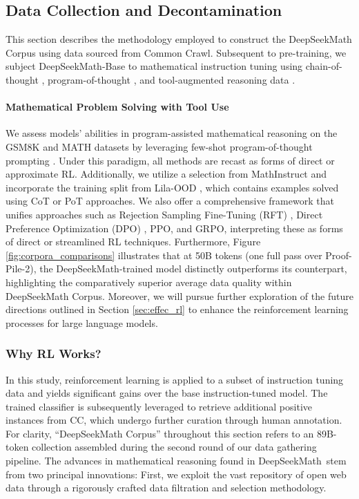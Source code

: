 \subsection{Data Collection and Decontamination} 
This section describes the methodology employed to construct the DeepSeekMath Corpus using data sourced from Common Crawl. Subsequent to pre-training, we subject DeepSeekMath-Base to mathematical instruction tuning using chain-of-thought \citep{cot}, program-of-thought \citep{pot,pal}, and tool-augmented reasoning data \citep{tora}. \paragraph{Mathematical Problem Solving with Tool Use}

We assess models’ abilities in program-assisted mathematical reasoning on the GSM8K and MATH datasets by leveraging few-shot program-of-thought prompting \citep{pot,pal}. Under this paradigm, all methods are recast as forms of direct or approximate RL. Additionally, we utilize a selection from MathInstruct \citep{MathInstruct} and incorporate the training split from Lila-OOD \citep{lila}, which contains examples solved using CoT or PoT approaches. We also offer a comprehensive framework that unifies approaches such as Rejection Sampling Fine-Tuning (RFT) \citep{yuan2023scaling}, Direct Preference Optimization (DPO) \citep{dpo}, PPO, and GRPO, interpreting these as forms of direct or streamlined RL techniques. Furthermore, Figure \ref{fig:corpora_comparisons} illustrates that at 50B tokens (one full pass over Proof-Pile-2), the DeepSeekMath-trained model distinctly outperforms its counterpart, highlighting the comparatively superior average data quality within DeepSeekMath Corpus. Moreover, we will pursue further exploration of the future directions outlined in Section \ref{sec:effec_rl} to enhance the reinforcement learning processes for large language models. \subsubsection{Why RL Works?} In this study, reinforcement learning is applied to a subset of instruction tuning data and yields significant gains over the base instruction-tuned model. The trained classifier is subsequently leveraged to retrieve additional positive instances from CC, which undergo further curation through human annotation. For clarity, “DeepSeekMath Corpus” throughout this section refers to an 89B-token collection assembled during the second round of our data gathering pipeline. The advances in mathematical reasoning found in DeepSeekMath~stem from two principal innovations: First, we exploit the vast repository of open web data through a rigorously crafted data filtration and selection methodology. 
